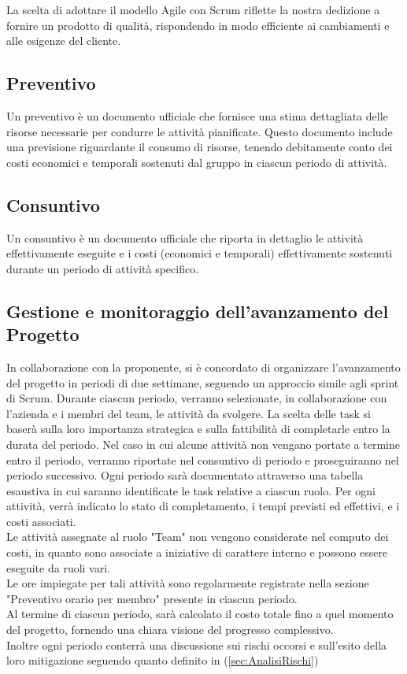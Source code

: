 \documentclass{article}
\begin{document}
La scelta di adottare il modello Agile con Scrum riflette la nostra dedizione a fornire un prodotto di qualità, rispondendo in modo efficiente ai cambiamenti e alle esigenze del cliente.


\subsection{Preventivo}
Un preventivo è un documento ufficiale che fornisce una stima dettagliata delle risorse necessarie per condurre le attività pianificate. Questo documento include una previsione riguardante il consumo di risorse, tenendo debitamente conto dei costi economici e temporali sostenuti dal gruppo in ciascun periodo di attività.
\subsection{Consuntivo}
Un consuntivo è un documento ufficiale che riporta in dettaglio le attività effettivamente eseguite e i costi (economici e temporali) effettivamente sostenuti durante un periodo di attività specifico.

\subsection{Gestione e monitoraggio dell'avanzamento del Progetto}
In collaborazione con la proponente, si è concordato di organizzare l'avanzamento del progetto in periodi di due settimane, seguendo un approccio simile agli sprint di Scrum. Durante ciascun periodo, verranno selezionate, in collaborazione con l'azienda e i membri del team, le attività da svolgere.
La scelta delle task si baserà sulla loro importanza strategica e sulla fattibilità di completarle entro la durata del periodo. Nel caso in cui alcune attività non vengano portate a termine entro il periodo, verranno riportate nel consuntivo di periodo e proseguiranno nel periodo successivo.
Ogni periodo sarà documentato attraverso una tabella esaustiva in cui saranno identificate le task relative a ciascun ruolo. Per ogni attività, verrà indicato lo stato di completamento, i tempi previsti ed effettivi, e i costi associati.
\\Le attività assegnate al ruolo "Team" non vengono considerate nel computo dei costi, in quanto sono associate a iniziative di carattere interno e possono essere eseguite da ruoli vari.
\\ Le ore impiegate per tali attività sono regolarmente registrate nella sezione "Preventivo orario per membro" presente in ciascun periodo.
\\Al termine di ciascun periodo, sarà calcolato il costo totale fino a quel momento del progetto, fornendo una chiara visione del progresso complessivo.
\\Inoltre ogni periodo conterrà una discussione sui rischi occorsi e sull'esito della loro mitigazione seguendo quanto definito in (\ref{sec:AnalisiRischi})
\end{document}
